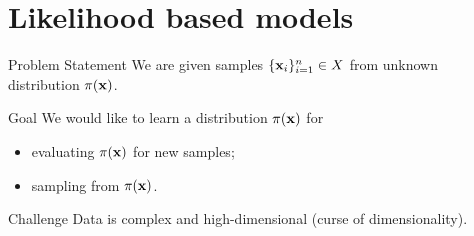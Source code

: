 \section{Likelihood based models}
\begin{frame}{Problem Statement}
We are given samples $\{\mathbf{x}_i\}_{i=1}^n \in X$ from unknown distribution $\pi(\mathbf{x})$.

\begin{block}{Goal}
	We would like to learn a distribution $\pi(\mathbf{x})$ for 
	\begin{itemize}
	    \item evaluating $\pi(\mathbf{x})$ for new samples;
	    \item sampling from $\pi(\mathbf{x})$.
	\end{itemize}
\end{block}
\begin{block}{Challenge}
	 Data is complex and high-dimensional (curse of dimensionality).
\end{block}
\end{frame}
